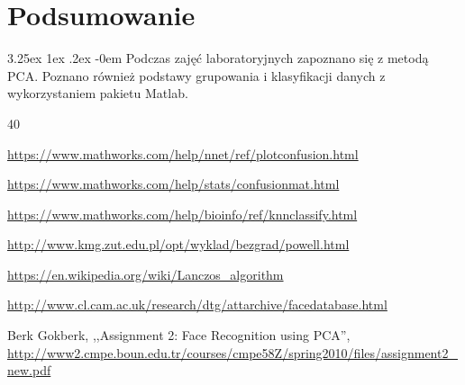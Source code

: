 \documentclass[11pt, a4paper]{article}
\makeatletter
\renewcommand\paragraph{\@startsection{paragraph}{5}{\z@}
  {3.25ex \@plus1ex \@minus.2ex}
  {-0em}
  {\normalfont\normalsize\bfseries}}
\makeatother
\begin{document}
\section{Podsumowanie}
\paragraph{}
Podczas zajęć laboratoryjnych zapoznano się z metodą PCA. Poznano również podstawy grupowania i klasyfikacji danych z wykorzystaniem pakietu Matlab.


\newpage
\begin{thebibliography}{40}

\url{https://www.mathworks.com/help/nnet/ref/plotconfusion.html}

\url{https://www.mathworks.com/help/stats/confusionmat.html}

\url{https://www.mathworks.com/help/bioinfo/ref/knnclassify.html}

\url{http://www.kmg.zut.edu.pl/opt/wyklad/bezgrad/powell.html}

\url{https://en.wikipedia.org/wiki/Lanczos_algorithm}

\url{http://www.cl.cam.ac.uk/research/dtg/attarchive/facedatabase.html}

Berk Gokberk, ,,Assignment 2: Face Recognition using PCA'',
\url{http://www2.cmpe.boun.edu.tr/courses/cmpe58Z/spring2010/files/assignment2_new.pdf}


\end{thebibliography}
\end{document}
